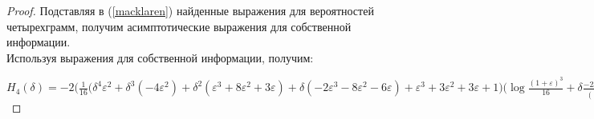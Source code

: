 \documentclass[a4paper,12pt]{article}
\theoremstyle{plain}
\begin{document}
\begin{proof}
	Подставляя в (\ref{macklaren}) найденные выражения для вероятностей четырехграмм, получим асимптотические выражения для собственной информации. \\
	Используя выражения для собственной информации, получим:
	
	$H_4(\delta)=-2\biggr(
	\tfrac{1}{16}\bigr(\delta^4\varepsilon^2+\delta^3(-4\varepsilon^2)+\delta^2(\varepsilon^3+8\varepsilon^2+3\varepsilon)+\delta(-2\varepsilon^3-8\varepsilon^2-6\varepsilon)+\varepsilon^3+3\varepsilon^2+3\varepsilon+1\bigr)\bigr(\log\frac{(1+\varepsilon)^3}{16} + \delta \frac{-2\varepsilon^3-8\varepsilon^2-6\varepsilon}{(1+\varepsilon)^3\ln b} +O(\delta^2)\bigr) +
	2\tfrac{1}{16}\bigr(\delta^4(-\varepsilon^2)+\delta^3\cdot4\varepsilon^2+\delta^2(-\varepsilon^3-6\varepsilon^2+\varepsilon)+\delta(2\varepsilon^3+4\varepsilon^2-2\varepsilon)-\varepsilon^3-\varepsilon^2+\varepsilon+1\bigr)\bigr(\log\frac{(1-\varepsilon)(1+\varepsilon)^2}{16} + \delta \frac{2\varepsilon^3+4\varepsilon^2-2\varepsilon}{(1-\varepsilon)(1+\varepsilon)^2\ln b} +O(\delta^2)\bigr) +
	2\tfrac{1}{16}\bigr(\delta^4(-\varepsilon^2)+\delta^3\cdot4\varepsilon^2+\delta^2(\varepsilon^3-6\varepsilon^2-\varepsilon)+\delta(-2\varepsilon^3+4\varepsilon^2+2\varepsilon)+\varepsilon^3-\varepsilon^2-\varepsilon+1\bigr)\bigr(\log\frac{(1-\varepsilon)^2(1+\varepsilon)}{16} + \delta \frac{-2\varepsilon^3+4\varepsilon^2+2\varepsilon}{(1-\varepsilon)^2(1+\varepsilon)\ln b}+O(\delta^2)\bigr) +
	\tfrac{1}{16}\bigr(\delta^4\varepsilon^2+\delta^3(-4\varepsilon^2)+\delta^2(-\varepsilon^3+4\varepsilon^2+\varepsilon)+\delta(2\varepsilon^3-2\varepsilon)-\varepsilon^3-\varepsilon^2+\varepsilon+1\bigr)\bigr(log\frac{(1-\varepsilon)(1+\varepsilon)^2}{16} + \delta \frac{2\varepsilon^3-2\varepsilon}{(1-\varepsilon)(1+\varepsilon)^2\ln b} +O(\delta^2)\bigr) +
	\tfrac{1}{16}\bigr(\delta^4\varepsilon^2+\delta^3(-4\varepsilon^2)+\delta^2(\varepsilon^3+4\varepsilon^2-\varepsilon)+\delta(-2\varepsilon^3+2\varepsilon)+\varepsilon^3-\varepsilon^2-\varepsilon+1\bigr)\bigr(\log\frac{(1-\varepsilon)^2(1+\varepsilon)}{16} + \delta \frac{-2\varepsilon^3+2\varepsilon}{(1-\varepsilon)^2(1+\varepsilon)\ln b}+O(\delta^2)\bigr) +
	\tfrac{1}{16}\bigr(\delta^4\varepsilon^2+\delta^3(-4\varepsilon^2)+\delta^2(-\varepsilon^3+8\varepsilon^2-3\varepsilon)+\delta(2\varepsilon^3-8\varepsilon^2+6\varepsilon)-\varepsilon^3+3\varepsilon^2-3\varepsilon+1\bigr)\bigr(\log\frac{(1-\varepsilon)^3}{16} + \delta \frac{2\varepsilon^3-8\varepsilon^2+6\varepsilon}{(1-\varepsilon)^3\ln b} +O(\delta^2)\bigr) 
	\biggr) = 
	\tfrac{(1+\varepsilon)^3}{16}\log\tfrac{(1+\varepsilon)^3}{16} + 3 \tfrac{(1+\varepsilon)^2(1-\varepsilon)}{16}\log\tfrac{(1+\varepsilon)^2(1-\varepsilon)}{16}+3\tfrac{(1+\varepsilon)(1-\varepsilon)^2}{16}\log\tfrac{(1+\varepsilon)(1-\varepsilon)^2}{16}+ \tfrac{(1-\varepsilon)^3}{16}\log\tfrac{(1-\varepsilon)^3}{16}+\frac{24\varepsilon\delta}{16} \log\frac{1+\varepsilon}{1-\varepsilon}+ O(\delta^2) = H_4(0)+\frac{24\varepsilon\delta}{16} \log\frac{1+\varepsilon}{1-\varepsilon}+ O(\delta^2).$
\end{proof}
\end{document}
